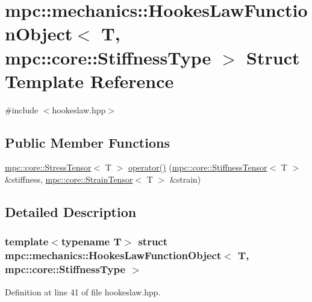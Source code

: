 \hypertarget{structmpc_1_1mechanics_1_1_hookes_law_function_object_3_01_t_00_01mpc_1_1core_1_1_stiffness_type_01_4}{}\section{mpc\+:\+:mechanics\+:\+:Hookes\+Law\+Function\+Object$<$ T, mpc\+:\+:core\+:\+:Stiffness\+Type $>$ Struct Template Reference}
\label{structmpc_1_1mechanics_1_1_hookes_law_function_object_3_01_t_00_01mpc_1_1core_1_1_stiffness_type_01_4}


{\ttfamily \#include $<$hookeslaw.\+hpp$>$}

\subsection*{Public Member Functions}
\begin{DoxyCompactItemize}
\item 
\mbox{\hyperlink{structmpc_1_1core_1_1_stress_tensor}{mpc\+::core\+::\+Stress\+Tensor}}$<$ T $>$ \mbox{\hyperlink{structmpc_1_1mechanics_1_1_hookes_law_function_object_3_01_t_00_01mpc_1_1core_1_1_stiffness_type_01_4_a4d0b04ae39c5feb98e36182a869dbbc6}{operator()}} (\mbox{\hyperlink{structmpc_1_1core_1_1_stiffness_tensor}{mpc\+::core\+::\+Stiffness\+Tensor}}$<$ T $>$ \&stiffness, \mbox{\hyperlink{structmpc_1_1core_1_1_strain_tensor}{mpc\+::core\+::\+Strain\+Tensor}}$<$ T $>$ \&strain)
\end{DoxyCompactItemize}


\subsection{Detailed Description}
\subsubsection*{template$<$typename T$>$\newline
struct mpc\+::mechanics\+::\+Hookes\+Law\+Function\+Object$<$ T, mpc\+::core\+::\+Stiffness\+Type $>$}



Definition at line 41 of file hookeslaw.\+hpp.



